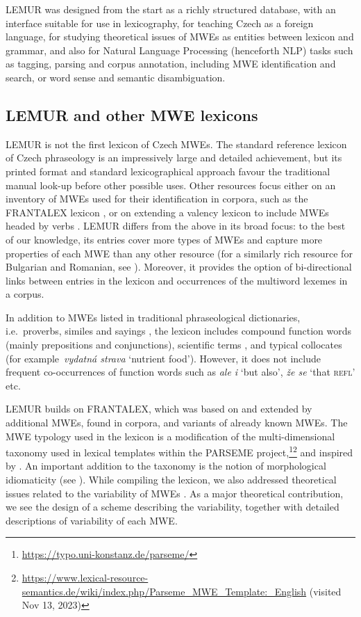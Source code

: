 \documentclass[output=paper,colorlinks,citecolor=brown]{langscibook}
\begin{document}
LEMUR was designed from the start as a richly structured database, with an interface suitable for use in lexicography, for teaching Czech as a foreign language, for studying theoretical issues of MWEs as entities between lexicon and grammar, and also for Natural Language Processing (henceforth NLP) tasks such as tagging, parsing and corpus annotation, including MWE identification and search, or word sense and semantic disambiguation. 

\subsection{LEMUR and other MWE lexicons}
\label{sec:previous-lexica}

LEMUR is not the first lexicon of Czech MWEs. The standard reference lexicon of Czech phraseology \citep{Cermak:2009} is an impressively  large and detailed achievement, but its printed format and standard lexicographical approach favour the traditional manual look-up before other possible uses. Other resources focus either on an inventory of MWEs used for their identification in corpora, such as the FRANTALEX lexicon \citep{Hnatkova:2002,Koprivova:Hnatkova:2014}, or on extending a valency lexicon to include MWEs headed by verbs \citep{Uresova:2009,vallex:2014,Przepiorkowski:etal:2016}. LEMUR differs from the above in its broad focus: to the best of our knowledge, its entries cover more types of MWEs and capture more properties of each MWE than any other resource (for a similarly rich resource for Bulgarian and Romanian, see ). Moreover, it provides the option of bi-directional links between entries in the lexicon and occurrences of the multiword lexemes in a corpus.

In addition to MWEs listed in traditional phraseological dictionaries, i.e.\ proverbs, similes and sayings \citep{Burger:Dobrovolskij:eds:2007}, the lexicon includes compound function words (mainly prepositions and conjunctions), scientific terms \citep{Kovarikova:Kovarik:2019}, and typical collocates (for example\ \textit{vydatná strava} `nutrient food'). However, it does not include frequent co-occurrences of function words such as \textit{ale i} `but also', \textit{že se} `that \textsc{refl}' etc.

LEMUR builds on FRANTALEX, which was based on \citet{Cermak:2009} and extended by additional MWEs, found in corpora, and variants of already known MWEs.
The MWE typology used in the lexicon is a modification of the multi-dimensional taxonomy used in lexical templates within the PARSEME  %
project,\footnote{\url{https://typo.uni-konstanz.de/parseme/}}\footnote{\url{https://www.lexical-resource-semantics.de/wiki/index.php/Parseme_MWE_Template:_English} (visited Nov 13, 2023)} and inspired by \citet{baldwin2010multiword}.
An important addition to the taxonomy is the notion of morphological idiomaticity (see ).
While compiling the lexicon, we also addressed theoretical issues related to the variability of MWEs \citep{Pasquer:etal:2018}. As a major theoretical contribution, we see the design of a scheme describing the variability, together with detailed descriptions of variability of each MWE. 
\end{document}
